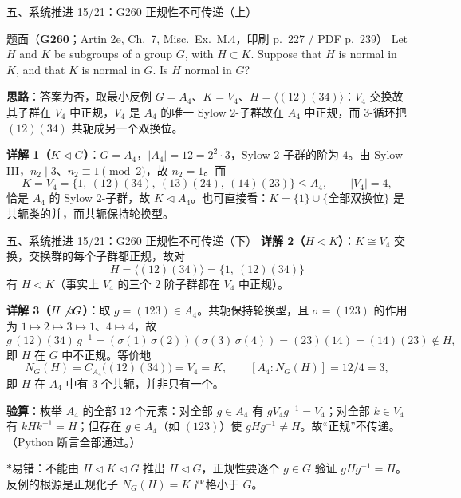 \documentclass[aspectratio=169,10pt,fontset=none]{ctexbeamer}
\newcommand{\ex}[1]{\textcolor{accent}{\footnotesize\bfseries #1}}
\newcommand{\key}[1]{\textcolor{ink}{\bfseries #1}}
\newcommand{\starpt}{\textcolor{accent}{\bfseries$\ast$}}
\begin{document}

\begin{frame}[t]{五、系统推进 15/21：G260 正规性不可传递（上）}
\label{ex:G260}
\scriptsize
\begin{block}{\footnotesize 题面（\ex{G260}；Artin 2e, Ch.~7, Misc.\ Ex.~M.4，印刷 p.~227 / PDF p.~239）}
Let $H$ and $K$ be subgroups of a group $G$, with $H\subset K$. Suppose that $H$ is normal in $K$, and that $K$ is normal in $G$. Is $H$ normal in $G$?
\end{block}
\key{思路}：答案为否，取最小反例 $G=A_4$、$K=V_4$、$H=\langle(12)(34)\rangle$：$V_4$ 交换故其子群在 $V_4$ 中正规，$V_4$ 是 $A_4$ 的唯一 Sylow $2$-子群故在 $A_4$ 中正规，而 $3$-循环把 $(12)(34)$ 共轭成另一个双换位。

\key{详解 1（$K\triangleleft G$）}：$G=A_4$，$|A_4|=12=2^2\cdot3$，Sylow $2$-子群的阶为 $4$。由 Sylow III，$n_2\mid3$、$n_2\equiv1\pmod2$，故 $n_2=1$。而
\[ K=V_4=\{1,\ (12)(34),\ (13)(24),\ (14)(23)\}\le A_4,\qquad |V_4|=4, \]
恰是 $A_4$ 的 Sylow $2$-子群，故 $K\triangleleft A_4$。也可直接看：$K=\{1\}\cup\{\text{全部双换位}\}$ 是共轭类的并，而共轭保持轮换型。
\end{frame}

\begin{frame}[t]{五、系统推进 15/21：G260 正规性不可传递（下）}
\scriptsize
\key{详解 2（$H\triangleleft K$）}：$K\cong V_4$ 交换，交换群的每个子群都正规，故对
\[ H=\langle(12)(34)\rangle=\{1,\ (12)(34)\} \]
有 $H\triangleleft K$（事实上 $V_4$ 的三个 $2$ 阶子群都在 $V_4$ 中正规）。

\key{详解 3（$H\not\triangleleft G$）}：取 $g=(123)\in A_4$。共轭保持轮换型，且 $\sigma=(123)$ 的作用为 $1\mapsto2\mapsto3\mapsto1$、$4\mapsto4$，故
\[ g\,(12)(34)\,g^{-1}=(\sigma(1)\,\sigma(2))(\sigma(3)\,\sigma(4))=(23)(14)=(14)(23)\notin H, \]
即 $H$ 在 $G$ 中不正规。等价地
\[ N_G(H)=C_{A_4}\bigl((12)(34)\bigr)=V_4=K,\qquad [A_4:N_G(H)]=12/4=3, \]
即 $H$ 在 $A_4$ 中有 $3$ 个共轭，并非只有一个。

\key{验算}：枚举 $A_4$ 的全部 $12$ 个元素：对全部 $g\in A_4$ 有 $gV_4g^{-1}=V_4$；对全部 $k\in V_4$ 有 $kHk^{-1}=H$；但存在 $g\in A_4$（如 $(123)$）使 $gHg^{-1}\ne H$。故“正规”不传递。（Python 断言全部通过。）

\starpt 易错：不能由 $H\triangleleft K\triangleleft G$ 推出 $H\triangleleft G$，正规性要逐个 $g\in G$ 验证 $gHg^{-1}=H$。反例的根源是正规化子 $N_G(H)=K$ 严格小于 $G$。
\end{frame}
\end{document}
